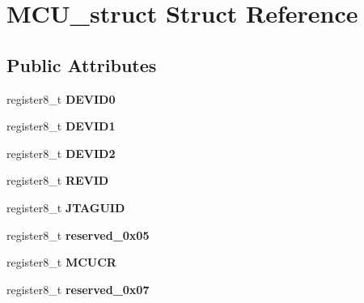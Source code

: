 \hypertarget{struct_m_c_u__struct}{}\section{M\+C\+U\+\_\+struct Struct Reference}
\label{struct_m_c_u__struct}
\subsection*{Public Attributes}
\begin{DoxyCompactItemize}
\item 
register8\+\_\+t {\bfseries D\+E\+V\+I\+D0}\hypertarget{struct_m_c_u__struct_ab8d62789898e31f6356ee2f797ffc18e}{}\label{struct_m_c_u__struct_ab8d62789898e31f6356ee2f797ffc18e}

\item 
register8\+\_\+t {\bfseries D\+E\+V\+I\+D1}\hypertarget{struct_m_c_u__struct_a1b901c61c8910324709fd7ce29d4dc8c}{}\label{struct_m_c_u__struct_a1b901c61c8910324709fd7ce29d4dc8c}

\item 
register8\+\_\+t {\bfseries D\+E\+V\+I\+D2}\hypertarget{struct_m_c_u__struct_a0d7e65f42906cfdce10cd1dfb3f0e89e}{}\label{struct_m_c_u__struct_a0d7e65f42906cfdce10cd1dfb3f0e89e}

\item 
register8\+\_\+t {\bfseries R\+E\+V\+ID}\hypertarget{struct_m_c_u__struct_a88e3c48004744d44ddce07f8773a80f9}{}\label{struct_m_c_u__struct_a88e3c48004744d44ddce07f8773a80f9}

\item 
register8\+\_\+t {\bfseries J\+T\+A\+G\+U\+ID}\hypertarget{struct_m_c_u__struct_ab075dbf965d4c42ed5dfa355ac73d350}{}\label{struct_m_c_u__struct_ab075dbf965d4c42ed5dfa355ac73d350}

\item 
register8\+\_\+t {\bfseries reserved\+\_\+0x05}\hypertarget{struct_m_c_u__struct_a4d84d15f87954e40fee299f0d0b7df9a}{}\label{struct_m_c_u__struct_a4d84d15f87954e40fee299f0d0b7df9a}

\item 
register8\+\_\+t {\bfseries M\+C\+U\+CR}\hypertarget{struct_m_c_u__struct_a0b3a8da42bb1e3f9331e0497a3720268}{}\label{struct_m_c_u__struct_a0b3a8da42bb1e3f9331e0497a3720268}

\item 
register8\+\_\+t {\bfseries reserved\+\_\+0x07}\hypertarget{struct_m_c_u__struct_a4ff5da78997c21c3adae9f741694ac15}{}\label{struct_m_c_u__struct_a4ff5da78997c21c3adae9f741694ac15}


\end{DoxyCompactItemize}
